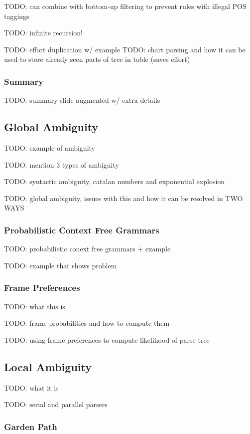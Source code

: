 \documentclass{article}
\begin{document}
TODO: can combine with bottom-up filtering to prevent rules with illegal POS taggings

TODO: infinite recursion!

TODO: effort duplication w/ example
TODO: chart parsing and how it can be used to store already seen parts of tree in table (saves effort)

\subsubsection{Summary}

TODO: summary slide augmented w/ extra details

\subsection{Global Ambiguity}

TODO: example of ambiguity

TODO: mention 3 types of ambiguity

TODO: syntactic ambiguity, catalan numbers and exponential explosion

TODO: global ambiguity, issues with this and how it can be resolved in TWO WAYS

\subsubsection{Probabilistic Context Free Grammars}

TODO: probabilistic conext free grammars + example

TODO: example that shows problem

\subsubsection{Frame Preferences}

TODO: what this is

TODO: frame probabilities and how to compute them

TODO: using frame preferences to compute likelihood of parse tree

\subsection{Local Ambiguity}

TODO: what it is

TODO: serial and parallel parsers

\subsubsection{Garden Path}
\end{document}
